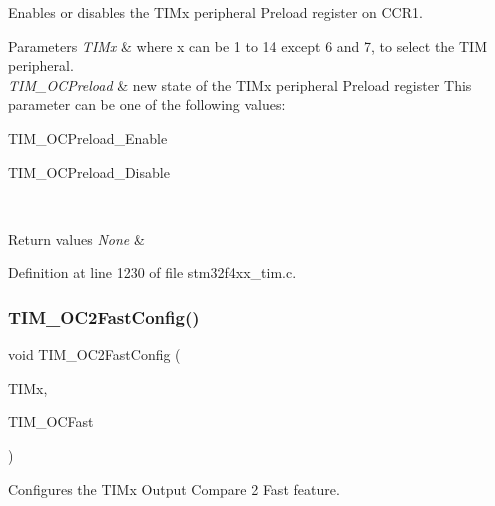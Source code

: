 Enables or disables the T\+I\+Mx peripheral Preload register on C\+C\+R1. 


\begin{DoxyParams}{Parameters}
{\em T\+I\+Mx} & where x can be 1 to 14 except 6 and 7, to select the T\+IM peripheral. \\
\hline
{\em T\+I\+M\+\_\+\+O\+C\+Preload} & new state of the T\+I\+Mx peripheral Preload register This parameter can be one of the following values\+: \begin{DoxyItemize}
\item T\+I\+M\+\_\+\+O\+C\+Preload\+\_\+\+Enable \item T\+I\+M\+\_\+\+O\+C\+Preload\+\_\+\+Disable \end{DoxyItemize}
\\
\hline
\end{DoxyParams}

\begin{DoxyRetVals}{Return values}
{\em None} & \\
\hline
\end{DoxyRetVals}


Definition at line 1230 of file stm32f4xx\+\_\+tim.\+c.

\mbox{\label{group___t_i_m___group2_ga413359c87f46c69f1ffe2dc8fb3a65e7}} 
\subsubsection{\texorpdfstring{T\+I\+M\+\_\+\+O\+C2\+Fast\+Config()}{TIM\_OC2FastConfig()}}
{\footnotesize\ttfamily void T\+I\+M\+\_\+\+O\+C2\+Fast\+Config (\begin{DoxyParamCaption}\item[{\hyperlink{struct_t_i_m___type_def}{T\+I\+M\+\_\+\+Type\+Def} $\ast$}]{T\+I\+Mx,  }\item[{uint16\+\_\+t}]{T\+I\+M\+\_\+\+O\+C\+Fast }\end{DoxyParamCaption})}



Configures the T\+I\+Mx Output Compare 2 Fast feature. 


